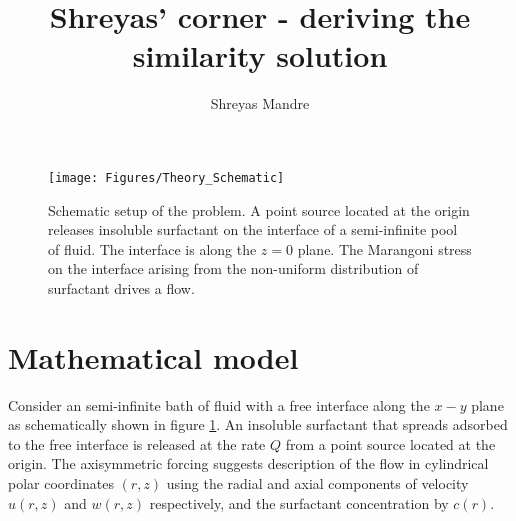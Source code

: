 \documentclass[aps, floatfix, superscriptaddress]{revtex4}
\begin{document}
 
\title{Shreyas' corner - deriving the similarity solution}
\author{Shreyas Mandre}
\maketitle

\begin{figure}
\texttt{[image: Figures/Theory\_Schematic]}
\caption{Schematic setup of the problem. A point source located at the origin releases insoluble surfactant on the interface of a semi-infinite pool of fluid. The interface is along the $z=0$ plane. The Marangoni stress on the interface arising from the non-uniform distribution of surfactant drives a flow.}
\label{fig:Theory_Schematic}
\end{figure}

\section{Mathematical model}
Consider an semi-infinite bath of fluid with a free interface along the $x-y$ plane as schematically shown in figure \ref{fig:Theory_Schematic}.
An insoluble surfactant that spreads adsorbed to the free interface is released at the rate $Q$ from a point source located at the origin.
The axisymmetric forcing suggests description of the flow in cylindrical polar coordinates $(r,z)$ using the radial and axial components of velocity $u(r,z)$ and $w(r,z)$ respectively, and the surfactant concentration by $c(r)$.
\end{document}
